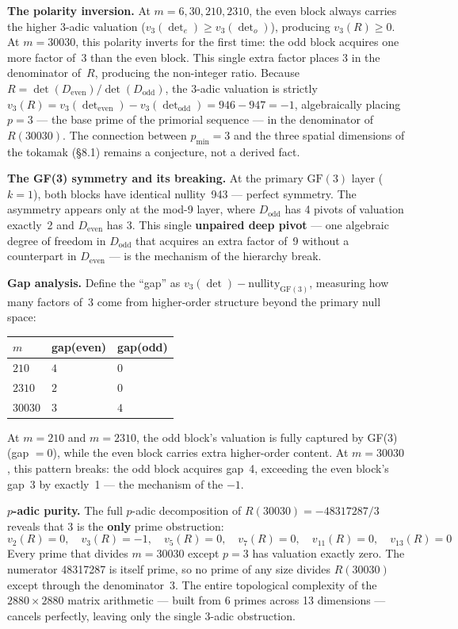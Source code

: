 \documentclass[11pt,letterpaper]{article}
\theoremstyle{definition}
\begin{document}
\textbf{The polarity inversion.} At $m = 6, 30, 210, 2310$, the even block always carries the higher 3-adic valuation ($v_3(\det_e) \geq v_3(\det_o)$), producing $v_3(R) \geq 0$. At $m = 30030$, this polarity inverts for the first time: the odd block acquires one more factor of~3 than the even block. This single extra factor places 3 in the denominator of~$R$, producing the non-integer ratio. Because $R = \det(D_{\text{even}}) / \det(D_{\text{odd}})$, the 3-adic valuation is strictly $v_3(R) = v_3(\det_{\text{even}}) - v_3(\det_{\text{odd}}) = 946 - 947 = -1$, algebraically placing $p = 3$ --- the base prime of the primorial sequence --- in the denominator of $R(30030)$. The connection between $p_{\text{min}} = 3$ and the three spatial dimensions of the tokamak (\S8.1) remains a conjecture, not a derived fact.

\medskip
\textbf{The GF(3) symmetry and its breaking.} At the primary $\text{GF}(3)$ layer ($k = 1$), both blocks have identical nullity~943 --- perfect symmetry. The asymmetry appears only at the mod-9 layer, where $D_{\text{odd}}$ has 4 pivots of valuation exactly~2 and $D_{\text{even}}$ has 3. This single \textbf{unpaired deep pivot} --- one algebraic degree of freedom in $D_{\text{odd}}$ that acquires an extra factor of~9 without a counterpart in $D_{\text{even}}$ --- is the mechanism of the hierarchy break.

\medskip
\textbf{Gap analysis.} Define the ``gap'' as $v_3(\det) - \text{nullity}_{\text{GF}(3)}$, measuring how many factors of~3 come from higher-order structure beyond the primary null space:

\begin{center}
\begin{tabular}{@{}lll@{}}
\toprule
$m$ & gap(even) & gap(odd) \\
\midrule
$210$   & $4$ & $0$ \\
$2310$  & $2$ & $0$ \\
$30030$ & $3$ & $4$ \\
\bottomrule
\end{tabular}
\end{center}

At $m = 210$ and $m = 2310$, the odd block's valuation is fully captured by GF(3) (gap $= 0$), while the even block carries extra higher-order content. At $m = 30030$, this pattern breaks: the odd block acquires gap~4, exceeding the even block's gap~3 by exactly~1 --- the mechanism of the $-1$.

\medskip
\textbf{$p$-adic purity.} The full $p$-adic decomposition of $R(30030) = -48317287/3$ reveals that 3 is the \textbf{only} prime obstruction:
\[
v_2(R) = 0, \quad v_3(R) = -1, \quad v_5(R) = 0, \quad v_7(R) = 0, \quad v_{11}(R) = 0, \quad v_{13}(R) = 0
\]
Every prime that divides $m = 30030$ except $p = 3$ has valuation exactly zero. The numerator 48317287 is itself prime, so no prime of any size divides $R(30030)$ except through the denominator~$3$. The entire topological complexity of the $2880 \times 2880$ matrix arithmetic --- built from 6 primes across 13 dimensions --- cancels perfectly, leaving only the single 3-adic obstruction.
\end{document}

